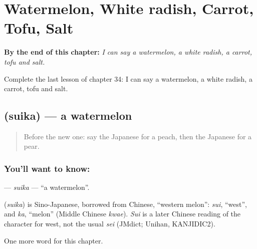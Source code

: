 
\chapter{Watermelon, White radish, Carrot, Tofu, Salt}
\label{ch:ja-watermelon-white-radish-carrot-tofu-salt}

\begin{chapteropening}
\textbf{By the end of this chapter:} \emph{I can say a watermelon, a white radish, a carrot, tofu and salt.}

Complete the last lesson of chapter 34: I can say a watermelon, a white radish, a carrot, tofu and salt.
\end{chapteropening}

\section[\texorpdfstring{\ja{すいか} (suika)}{すいか (suika)}]{ (suika) — a watermelon}

\label{lesson:JA-C34-suika}



\begin{quote}
Before the new one: say the Japanese for a peach, then the Japanese for a pear.
\end{quote}

\subsection*{You'll want to know: }
\textbf{} — \emph{suika} — \textquotedblleft{}a watermelon\textquotedblright{}.

\begin{cousinweb}
\textbf{} (\emph{suika}) is Sino-Japanese, borrowed from Chinese, \textquotedblleft{}western melon\textquotedblright{}: \emph{sui}, \textquotedblleft{}west\textquotedblright{}, and \emph{ka}, \textquotedblleft{}melon\textquotedblright{} (Middle Chinese \emph{kwae}). \emph{Sui} is a later Chinese reading of the character for west, not the usual \emph{sei} (JMdict; Unihan, KANJIDIC2).
\end{cousinweb}

\begin{grammarlens}[title={What you've built}]
One more word for this chapter.
\end{grammarlens}

